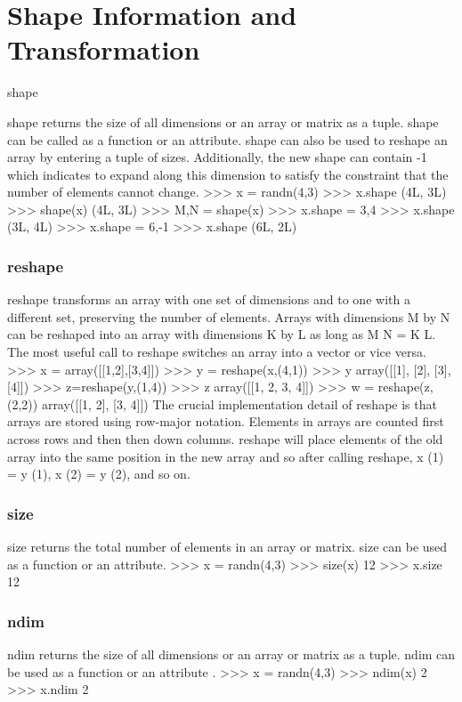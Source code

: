 

\section{Shape Information and Transformation}
shape

shape returns the size of all dimensions or an array or matrix as a tuple. shape can be called as a function
or an attribute. shape can also be used to reshape an array by entering a tuple of sizes. Additionally, the
new shape can contain -1 which indicates to expand along this dimension to satisfy the constraint that
the number of elements cannot change.
>>> x = randn(4,3)
>>> x.shape
(4L, 3L)
>>> shape(x)
(4L, 3L)
>>> M,N = shape(x)
>>> x.shape = 3,4
>>> x.shape
(3L, 4L)
>>> x.shape = 6,-1
>>> x.shape
(6L, 2L)
\subsubsection{reshape}

reshape transforms an array with one set of dimensions and to one with a different set, preserving the
number of elements. Arrays with dimensions M by N can be reshaped into an array with dimensions K
by L as long as M N = K L. The most useful call to reshape switches an array into a vector or vice versa.
>>> x = array([[1,2],[3,4]])
>>> y = reshape(x,(4,1))
>>> y
array([[1],
[2],
[3],
[4]])
>>> z=reshape(y,(1,4))
>>> z
array([[1, 2, 3, 4]])
>>> w = reshape(z,(2,2))
array([[1, 2],
[3, 4]])
The crucial implementation detail of reshape is that arrays are stored using row-major notation. Elements
in arrays are counted first across rows and then then down columns. reshape will place elements of the
old array into the same position in the new array and so after calling reshape, x (1) = y (1), x (2) = y (2),
and so on.
\subsubsection{size}
size returns the total number of elements in an array or matrix. size can be used as a function or an
attribute.
>>> x = randn(4,3)
>>> size(x)
12
>>> x.size
12
\subsubsection{ndim}
ndim returns the size of all dimensions or an array or matrix as a tuple. ndim can be used as a function or
an attribute .
>>> x = randn(4,3)
>>> ndim(x)
2
>>> x.ndim
2
